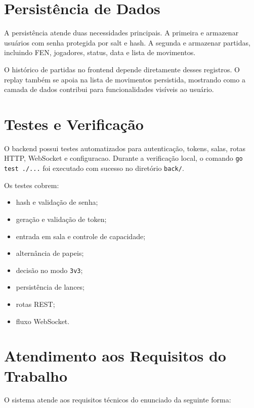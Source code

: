\documentclass[12pt]{article}
\begin{document}
\section{Persistência de Dados}

A persistência atende duas necessidades principais. A primeira e armazenar usuários com senha protegida por salt e hash. A segunda e armazenar partidas, incluindo FEN, jogadores, status, data e lista de movimentos.

O histórico de partidas no frontend depende diretamente desses registros. O replay também se apoia na lista de movimentos persistida, mostrando como a camada de dados contribui para funcionalidades visíveis ao usuário.

\section{Testes e Verificação}

O backend possui testes automatizados para autenticação, tokens, salas, rotas HTTP, WebSocket e configuracao. Durante a verificação local, o comando \texttt{go test ./...} foi executado com sucesso no diretório \texttt{back/}.

Os testes cobrem:

\begin{itemize}
    \item hash e validação de senha;
    \item geração e validação de token;
    \item entrada em sala e controle de capacidade;
    \item alternância de papeis;
    \item decisão no modo \texttt{3v3};
    \item persistência de lances;
    \item rotas REST;
    \item fluxo WebSocket.
\end{itemize}

\section{Atendimento aos Requisitos do Trabalho}

O sistema atende aos requisitos técnicos do enunciado da seguinte forma:
\end{document}
